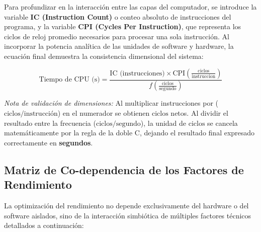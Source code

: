 \documentclass[12pt,letterpaper]{article}
\begin{document}
Para profundizar en la interacción entre las capas del computador, se introduce la variable \textbf{IC (Instruction Count)} o conteo absoluto de instrucciones del programa, y la variable \textbf{CPI (Cycles Per Instruction)}, que representa los ciclos de reloj promedio necesarios para procesar una sola instrucción. Al incorporar la potencia analítica de las unidades de software y hardware, la ecuación final demuestra la consistencia dimensional del sistema:

\begin{equation}
\text{Tiempo de CPU (s)} = \frac{\text{IC (instrucciones)} \times \text{CPI} \left(\frac{\text{ciclos}}{\text{instruccion}}\right)}{f \left(\frac{\text{ciclos}}{\text{segundo}}\right)}
\end{equation}

\textit{Nota de validación de dimensiones:} Al multiplicar instrucciones por ($\text{ciclos}/\text{instrucción}$) en el numerador se obtienen $\text{ciclos}$ netos. Al dividir el resultado entre la frecuencia ($\text{ciclos}/\text{segundo}$), la unidad de $\text{ciclos}$ se cancela matemáticamente por la regla de la doble C, dejando el resultado final expresado correctamente en \textbf{segundos}.

\subsection{Matriz de Co-dependencia de los Factores de Rendimiento}
La optimización del rendimiento no depende exclusivamente del hardware o del software aislados, sino de la interacción simbiótica de múltiples factores técnicos detallados a continuación:
\end{document}
